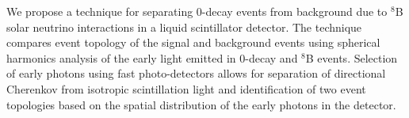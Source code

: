 We propose a technique for separating 0{\nbb}-decay events from
background due to $^8$B solar neutrino interactions in a liquid
scintillator detector. The technique compares event topology of the
signal and background events using spherical harmonics analysis of the
early light emitted in 0{\nbb}-decay and $^8$B events. Selection of
early photons using fast photo-detectors allows for separation of
directional Cherenkov from isotropic scintillation light and
identification of two event topologies based on the spatial
distribution of the early photons in the detector.
